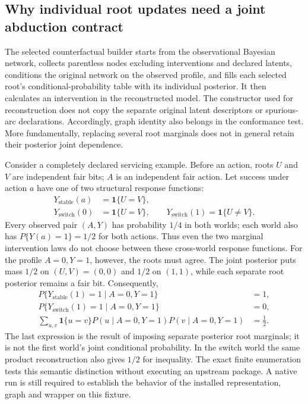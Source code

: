 \subsection{Why individual root updates need a joint abduction contract}
\label{exec19:cxxid-abduction}
The selected counterfactual builder starts from the observational Bayesian
network, collects parentless nodes excluding interventions and declared latents,
conditions the original network on the observed profile, and fills each selected
root's conditional-probability table with its individual posterior. It then
calculates an intervention in the reconstructed model. The constructor used
for reconstruction does not copy the separate original latent descriptors or
spurious-arc declarations. Accordingly, graph identity also belongs in the
conformance test. More fundamentally, replacing several root marginals does
not in general retain their posterior joint dependence.
\citep{exec19_cxx_identification_source}

Consider a completely declared servicing example. Before an action, roots
$U$ and $V$ are independent fair bits; $A$ is an independent fair action.
Let success under action $a$ have one of two structural response functions:
\begin{align}
 Y_{\mathrm{stable}}(a)&=\mathbf 1\{U=V\},\nonumber\\
 Y_{\mathrm{switch}}(0)&=\mathbf 1\{U=V\},\qquad
 Y_{\mathrm{switch}}(1)=\mathbf 1\{U\ne V\}.
 \label{exec19:cxxid-coupling}
\end{align}
Every observed pair $(A,Y)$ has probability $1/4$ in both worlds; each world
also has $P\{Y(a)=1\}=1/2$ for both actions. Thus even the two marginal
intervention laws do not choose between these cross-world response functions.
For the profile $A=0,Y=1$, however, the roots must agree. The joint posterior
puts mass $1/2$ on $(U,V)=(0,0)$ and $1/2$ on $(1,1)$, while each separate
root posterior remains a fair bit. Consequently,
\begin{align}
 P\{Y_{\mathrm{stable}}(1)=1\mid A=0,Y=1\}&=1,\nonumber\\
 P\{Y_{\mathrm{switch}}(1)=1\mid A=0,Y=1\}&=0,\nonumber\\
 \sum_{u,v}\mathbf 1\{u=v\}P(u\mid A=0,Y=1)P(v\mid A=0,Y=1)&=\tfrac12.
 \label{exec19:cxxid-joint}
\end{align}
The last expression is the result of imposing separate posterior root
marginals; it is not the first world's joint conditional probability. In the
switch world the same product reconstruction also gives $1/2$ for inequality.
The exact finite enumeration tests this semantic distinction without executing
an upstream package. A native run is still required to establish the behavior
of the installed representation, graph and wrapper on this fixture.
\citep{exec19_cxx_identification_reference}

